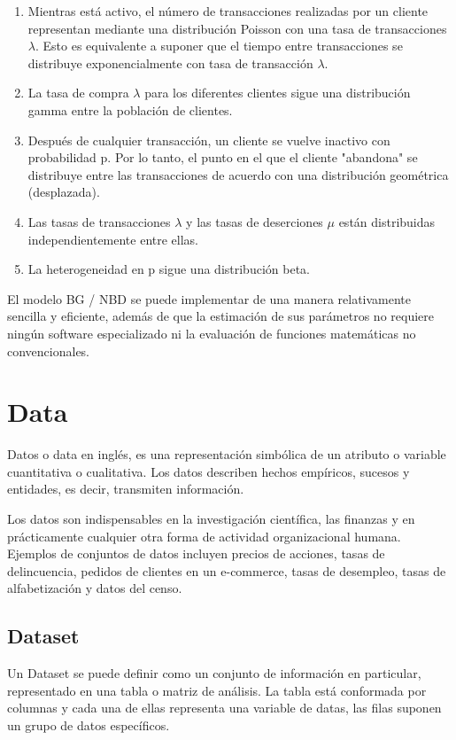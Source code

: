\begin{enumerate}
	\item Mientras está activo, el número de transacciones realizadas por un cliente representan mediante una distribución Poisson con una tasa de transacciones $\lambda$. Esto es equivalente a suponer que el tiempo entre transacciones se distribuye exponencialmente con tasa de transacción $\lambda$.
	\item La tasa de compra $\lambda$ para los diferentes clientes sigue una distribución gamma entre la población de clientes.
	\item Después de cualquier transacción, un cliente se vuelve inactivo con probabilidad p. Por lo tanto, el punto en el que el cliente "abandona" se distribuye entre las transacciones de acuerdo con una distribución geométrica (desplazada).	
	\item Las tasas de transacciones $\lambda$ y las tasas de deserciones $\mu$ están distribuidas independientemente entre ellas.
	\item La heterogeneidad en p sigue una distribución beta.
\end{enumerate}

El modelo BG / NBD se puede implementar de una manera relativamente sencilla y eficiente, además de que la estimación de sus parámetros no requiere ningún software especializado ni la evaluación de funciones matemáticas no convencionales.

\section{Data}

Datos o data en inglés, es una representación simbólica de un atributo o variable cuantitativa o cualitativa. Los datos describen hechos empíricos, sucesos y entidades, es decir, transmiten información. 

Los datos son indispensables en la investigación científica, las finanzas y en prácticamente cualquier otra forma de actividad organizacional humana. Ejemplos de conjuntos de datos incluyen precios de acciones, tasas de delincuencia, pedidos de clientes en un e-commerce, tasas de desempleo, tasas de alfabetización y datos del censo.
	
\subsection{Dataset}

Un Dataset se puede definir como un conjunto de información en particular, representado en una tabla o matriz de análisis. La tabla está conformada por columnas y cada una de ellas representa una variable de datas, las filas suponen un grupo de datos específicos.


